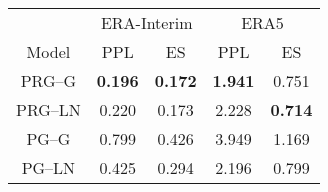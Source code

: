 
\begin{tabular}{ccccc}
\toprule
\multicolumn{1}{c}{ } & \multicolumn{2}{c}{ERA-Interim} & \multicolumn{2}{c}{ERA5} \\
\cmidrule(l{3pt}r{3pt}){2-3} \cmidrule(l{3pt}r{3pt}){4-5}
Model & PPL & ES & PPL & ES\\
\midrule
PRG--G  & {\bf 0.196} & {\bf 0.172} & {\bf 1.941} & 0.751       \\
PRG--LN & 0.220       & 0.173       & 2.228       & {\bf 0.714} \\
PG--G   & 0.799       & 0.426       & 3.949       & 1.169       \\
PG--LN  & 0.425       & 0.294       & 2.196       & 0.799       \\
\bottomrule
\end{tabular}
